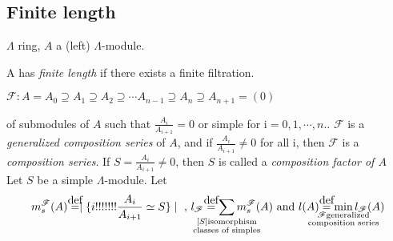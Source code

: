 \subsection{Finite length}
$\Lambda$ ring, $A$ a (left) $\Lambda$-module.
\begin{defin}
	A has \emph{finite length} if there exists a finite filtration.\\
	\begin{center}
			$\mathscr{F}\colon A = A_0 \supseteq A_1 \supseteq A_2 \supseteq \cdots A_{n-1} \supseteq A_{n} \supseteq A_{n+1} = (0) $\\
	\end{center}
of submodules of $A$ such that $\frac{A_i}{A_{i+1}} = 0$ or simple for i$=0,1,\cdots,n.$. 	$\mathscr{F}$ is a \emph{generalized composition series} of $A$, and if $\frac{A_i}{A_{i+1}} \ne 0$ for all i, then $\mathscr{F}$ is a \emph{composition series}. If $S=\frac{A_i}{A_{i+1}} \ne 0$, then $S$ is called a \emph{composition factor of $A$}\\

Let $S$ be a simple $\Lambda$-module. Let
\begin{equation*}
m_s^{\mathscr{F}}(A) \defeq\mid\{i !!!!!!! \frac{A_i}{A_{i+1}}\simeq S \}\mid \text{ , } 
l_{\mathscr{F}} \defeq \sum_{\mathclap{\substack{\small[S] \text{isomorphism} \\ \small\text{classes of simples}}}}m_s^{\mathscr{F}}(A) \text{ and } l(A) \defeq \min_{\mathclap{\substack{\mathscr{F} \text{generalized} \\ \text{composition series}}}} l_{\mathscr{F}}(A)
\end{equation*}
\end{defin}

